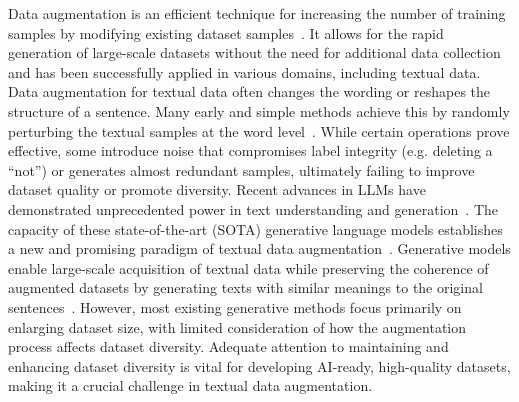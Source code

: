 Data augmentation is an efficient technique for increasing the number of training samples by modifying existing dataset samples~\cite{wang2024comprehensive}. 
It allows for the rapid generation of large-scale datasets without the need for additional data collection and has been successfully applied in various domains, including textual data. 
Data augmentation for textual data often changes the wording or reshapes the structure of a sentence. 
Many early and simple methods achieve this by randomly perturbing the textual samples at the word level~\cite{wei2019eda,karimi2021aeda}. 
While certain operations prove effective, some introduce noise that compromises label integrity (e.g. deleting a ``not'') or generates almost redundant samples, ultimately failing to improve dataset quality or promote diversity. 
Recent advances in LLMs have demonstrated unprecedented power in text understanding and generation~\cite{radford2018improving}. 
The capacity of these state-of-the-art (SOTA) generative language models establishes a new and promising paradigm of textual data augmentation~\cite{anaby2020not}. 
Generative models enable large-scale acquisition of textual data while preserving the coherence of augmented datasets by generating texts with similar meanings to the original sentences~\cite{dai2025auggpt}.
However, most existing generative methods focus primarily on enlarging dataset size, with limited consideration of how the augmentation process affects dataset diversity. 
Adequate attention to maintaining and enhancing dataset diversity is vital for developing AI-ready, high-quality datasets, making it a crucial challenge in textual data augmentation. 

